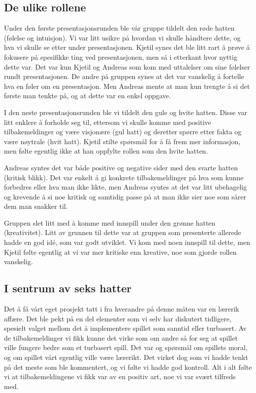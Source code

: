 \subsection{De ulike rollene}
Under den første presentasjonsrunden ble vår gruppe tildelt den røde hatten (følelse og intuisjon). Vi var litt usikre på hvordan vi skulle håndtere dette, og hva vi skulle se etter under presentasjonen. Kjetil synes det ble litt rart å prøve å fokusere på spesifikke ting ved presentasjonen, men så i etterkant hvor nyttig dette var. Det var  kun Kjetil og Andreas som kom med uttalelser om sine følelser rundt presentasjonen. De andre på gruppen synes at det var vanskelig å fortelle hva en føler om en presentasjon. Men Andreas mente at man kun trengte å si det første man tenkte på, og at dette var en enkel oppgave. 

I den neste presentasjonsrunden ble vi tildelt den gule og hvite hatten. Disse var litt enklere å forholde seg til, ettersom vi skulle komme med positive tilbakemeldinger og være visjonære (gul hatt) og deretter spørre etter fakta og være nøytrale (hvit hatt). Kjetil stilte spørsmål for å få frem mer informasjon, men følte egentlig ikke at han oppfylte rollen som den hvite hatten.

Andreas syntes det var både positive og negative sider med den svarte hatten (kritisk blikk). Det var enkelt å gi konkrete tilbakemeldinger på hva som kunne forbedres eller hva man ikke likte, men Andreas syntes at det var litt ubehagelig og krevende å si noe kritisk og samtidig passe på at man ikke sier noe som sårer dem man snakker til.

Gruppen slet litt med å komme med innspill under den grønne hatten (kreativitet). Litt av grunnen til dette var at gruppen som presenterte allerede hadde en god idé, som var godt utviklet. Vi kom med noen innspill til dette, men Kjetil følte egentlig at vi var mer kritiske enn kreative, noe som gjorde rollen vanskelig.


\subsection{I sentrum av seks hatter}
Det å få vårt eget prosjekt tatt i fra hverandre på denne måten var en lærerik affære. Det ble pekt på en del elementer som vi selv har diskutert tidligere, spesielt valget mellom det å implementere spillet som sanntid eller turbasert. Av de tilbakemeldinger vi fikk kunne det virke som om andre så for seg at spillet ville fungere bedre som et turbasert spill. Det var og spørsmål om spillets moral, og om spillet vårt egentlig ville være lærerikt. Det virket dog som vi hadde tenkt på det meste som ble kommentert, og vi følte vi hadde god kontroll. Alt i alt følte vi at tilbakemeldingene vi fikk var av en positiv art, noe vi var svært tilfreds med. 

